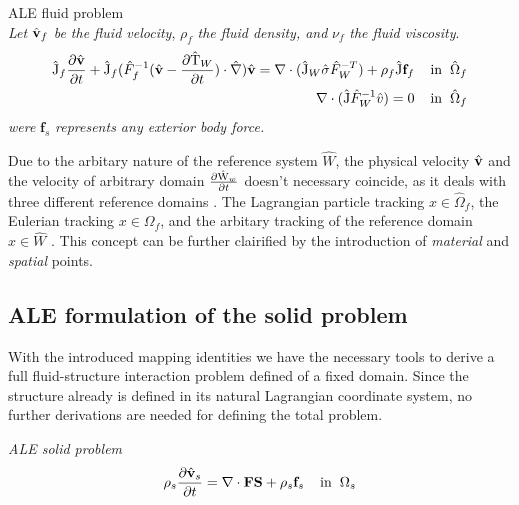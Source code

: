 \begin{equat}
ALE fluid problem \\ 
\textit{Let } $\hat{\mathbf{v}}_f$ \textit{be the fluid velocity}, $\rho_f$  \textit{the fluid density, and }  $\nu_f$  \textit{the fluid viscosity}.
\begin{align}
\text{\^{J}}_f \frac{\partial \hat{\mathbf{v}}}{\partial t} + \text{\^{J}}_f (\hat{F}_f^{-1}(\hat{\mathbf{v}} - \frac{\partial \text{\^{T}}_W}{\partial t}) \cdot \hat{\nabla}) \hat{\mathbf{v}}
= \nabla \cdot (\text{\^{J}}_W \hat{\sigma}\hat{F}_W^{-T}) + \rho_f \text{\^{J}} \mathbf{f}_f
\hspace{4mm} \text{in} \hspace{2mm} \hat{\Omega}_f \\
\nabla \cdot (\text{\^{J}} \hat{F}_W^{-1} \hat{v}) = 0 \hspace{4mm} \text{in} \hspace{2mm} \hat{\Omega}_f 
\end{align}
\textit{were}  $\mathbf{f}_s$  \textit{represents any exterior body force.}
\end{equat}

Due to the arbitary nature of the reference system $\hat{W}$, the physical velocity $\hat{\mathbf{v}}$ and the velocity of arbitrary domain $\frac{\partial \text{\^{W}}_w}{\partial t}$ doesn't necessary coincide, as it deals with three different reference domains \cite{Richter2016}. The Lagrangian particle tracking $x \in \hat{\Omega}_f $, the Eulerian tracking $x \in \Omega_f $, and the arbitary tracking of the reference domain  $x \in \hat{W} $ \cite{Richter2016}. This concept can be further clairified by the introduction of \textit{material} and \textit{spatial} points. 

\subsection{ALE formulation of the solid problem}

With the introduced mapping identities we have the necessary tools to derive a full fluid-structure interaction problem defined of a fixed domain. Since the structure already is defined in its natural Lagrangian coordinate system, no further derivations are needed for defining the total problem.

\begin{equat}
\textit{ALE solid problem}
\begin{align}
\rho_s \frac{\partial \hat{\mathbf{v}}_s}{\partial t} = \nabla \cdot \mathbf{F}\mathbf{S} + \rho_s \mathbf{f}_s
\hspace{4mm} \text{in} \hspace{2mm} \Omega_s \\
\end{align}
\end{equat}

